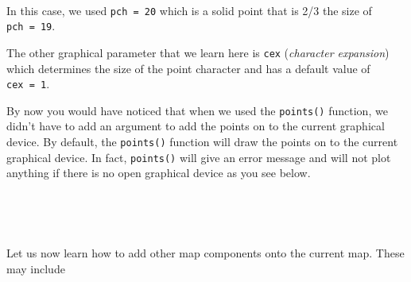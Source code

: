 \documentclass[12pt,a4paper,a4paper]{book}
\newenvironment{Shaded}{\begin{snugshade}}{\end{snugshade}}
\newcommand{\KeywordTok}[1]{\textcolor[rgb]{0.13,0.29,0.53}{\textbf{#1}}}
\newcommand{\DataTypeTok}[1]{\textcolor[rgb]{0.13,0.29,0.53}{#1}}
\newcommand{\DecValTok}[1]{\textcolor[rgb]{0.00,0.00,0.81}{#1}}
\newcommand{\FloatTok}[1]{\textcolor[rgb]{0.00,0.00,0.81}{#1}}
\newcommand{\StringTok}[1]{\textcolor[rgb]{0.31,0.60,0.02}{#1}}
\newcommand{\OperatorTok}[1]{\textcolor[rgb]{0.81,0.36,0.00}{\textbf{#1}}}
\newcommand{\NormalTok}[1]{#1}
\theoremstyle{definition}
\theoremstyle{definition}
\theoremstyle{definition}
\theoremstyle{remark}
\begin{document}
~

In this case, we used \texttt{pch\ =\ 20} which is a solid point that is
2/3 the size of \texttt{pch\ =\ 19}.

The other graphical parameter that we learn here is \texttt{cex}
(\emph{character expansion}) which determines the size of the point
character and has a default value of \texttt{cex\ =\ 1}.

By now you would have noticed that when we used the \texttt{points()}
function, we didn't have to add an argument to add the points on to the
current graphical device. By default, the \texttt{points()} function
will draw the points on to the current graphical device. In fact,
\texttt{points()} will give an error message and will not plot anything
if there is no open graphical device as you see below.

~

\begin{Shaded}
\end{Shaded}

~

Let us now learn how to add other map components onto the current map.
These may include

~
\end{document}
